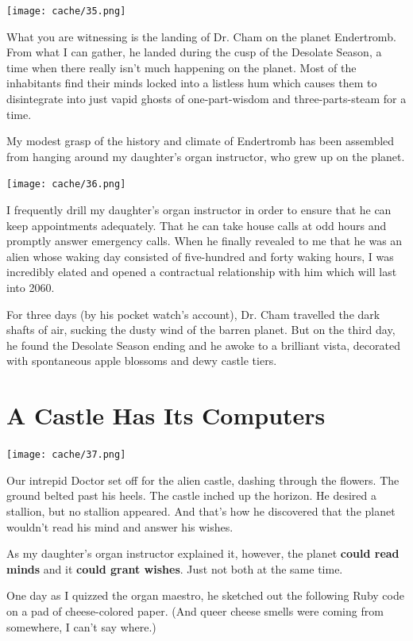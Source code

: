 \documentclass[12pt,twoside]{report}
\begin{document}
	\texttt{[image: cache/35.png]}

What you are witnessing is the landing of Dr. Cham on the planet
Endertromb.  From what I can gather, he landed during the cusp of the
Desolate Season, a time when there really isn't much happening on the
planet.  Most of the inhabitants find their minds locked into a
listless hum which causes them to disintegrate into just vapid ghosts
of one-part-wisdom and three-parts-steam for a time.

My modest grasp of the history and climate of Endertromb has been
assembled from hanging around my daughter's organ instructor, who grew
up on the planet.

	\texttt{[image: cache/36.png]}

I frequently drill my daughter's organ instructor in order to ensure
that he can keep appointments adequately.  That he can take house
calls at odd hours and promptly answer emergency calls. When he
finally revealed to me that he was an alien whose waking day consisted
of five-hundred and forty waking hours, I was incredibly elated and
opened a contractual relationship with him which will last into 2060.

For three days (by his pocket watch's account), Dr. Cham travelled the
dark shafts of air, sucking the dusty wind of the barren planet. But
on the third day, he found the Desolate Season ending and he awoke to
a brilliant vista, decorated with spontaneous apple blossoms and dewy
castle tiers.


\section{A Castle Has Its Computers}


	\texttt{[image: cache/37.png]}

Our intrepid Doctor set off for the alien castle, dashing through the
flowers.  The ground belted past his heels.  The castle inched up the
horizon.  He desired a stallion, but no stallion appeared.  And that's
how he discovered that the planet wouldn't read his mind and answer
his wishes.

As my daughter's organ instructor explained it, however, the planet
{\bf could read minds} and it {\bf could grant wishes}.  Just not both
at the same time.

One day as I quizzed the organ maestro, he sketched out the following
Ruby code on a pad of cheese-colored paper.  (And queer cheese smells
were coming from somewhere, I can't say where.)
\end{document}
